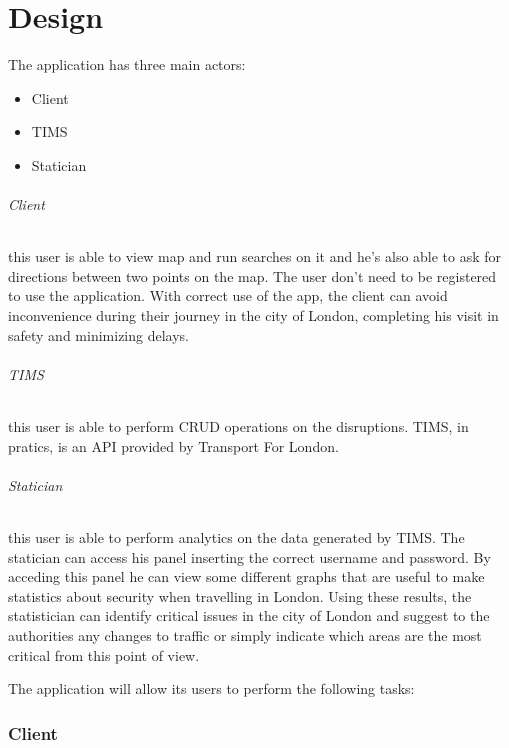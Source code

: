
\part{Design}


The application has three main actors:
\begin{itemize}
	\item Client
	\item TIMS
	\item Statician
\end{itemize}

\paragraph{Client}
this user is able to view map and run searches on it and he’s also able to ask 
for directions between two points on the map. The user don't need to be registered to use the application. With correct use of the app, the client can avoid inconvenience during their journey in the city of London, completing his visit in safety and minimizing delays.

\paragraph{TIMS}
this user is able to perform CRUD operations on the disruptions. TIMS, in pratics, is an API provided by Transport For London.

\paragraph{Statician}
this user is able to perform analytics on the data generated by TIMS. The statician can access his panel inserting the correct username and password. By acceding this panel he can view some different graphs that are useful to make statistics about security when travelling in London. Using these results, the statistician can identify critical issues in the city of London and suggest to the authorities any changes to traffic or simply indicate which areas are the most critical from this point of view.



The application will allow its users to perform the following tasks:

\section{Client}

